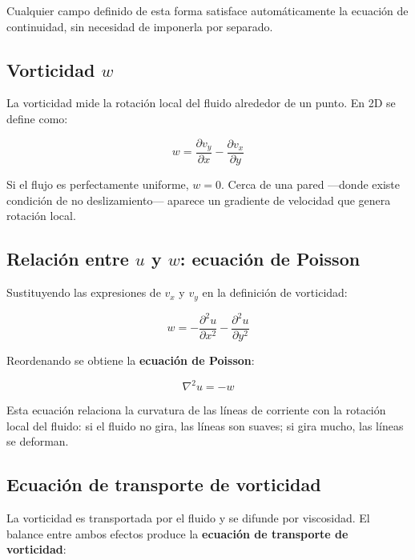 \documentclass[12pt, a4paper]{article}
\begin{document}
Cualquier campo definido de esta forma satisface automáticamente la ecuación de
continuidad, sin necesidad de imponerla por separado.

\subsection{Vorticidad \texorpdfstring{$w$}{w}}

La vorticidad mide la rotación local del fluido alrededor de un punto. En 2D se
define como:

\begin{equation}
  w = \frac{\partial v_y}{\partial x} - \frac{\partial v_x}{\partial y}
\end{equation}

Si el flujo es perfectamente uniforme, $w = 0$. Cerca de una pared —donde existe
condición de no deslizamiento— aparece un gradiente de velocidad que genera
rotación local.

\subsection{Relación entre \texorpdfstring{$u$}{u} y \texorpdfstring{$w$}{w}: ecuación de Poisson}

Sustituyendo las expresiones de $v_x$ y $v_y$ en la definición de vorticidad:

\begin{equation}
  w = -\frac{\partial^{2} u}{\partial x^{2}} - \frac{\partial^{2} u}{\partial y^{2}}
\end{equation}

Reordenando se obtiene la \textbf{ecuación de Poisson}:

\begin{ecbox}
  \begin{equation}
    \nabla^{2} u = -w
    \label{eq:poisson}
  \end{equation}
\end{ecbox}

Esta ecuación relaciona la curvatura de las líneas de corriente con la rotación
local del fluido: si el fluido no gira, las líneas son suaves; si gira mucho,
las líneas se deforman.

\subsection{Ecuación de transporte de vorticidad}

La vorticidad es transportada por el fluido y se difunde por viscosidad. El
balance entre ambos efectos produce la \textbf{ecuación de transporte de
vorticidad}:
\end{document}
